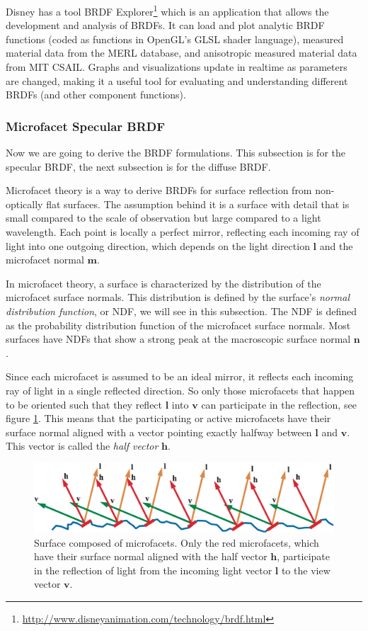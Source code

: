 Disney has a tool BRDF Explorer\footnote{\url{http://www.disneyanimation.com/technology/brdf.html}} which is an application that allows the development and analysis of BRDFs. It can load and plot analytic BRDF functions (coded as functions in OpenGL's GLSL shader language), measured material data from the MERL database, and anisotropic measured material data from MIT CSAIL. Graphs and visualizations update in realtime as parameters are changed, making it a useful tool for evaluating and understanding different BRDFs (and other component functions).


\subsubsection{Microfacet Specular BRDF}
Now we are going to derive the BRDF formulations. This subsection is for the specular BRDF, the next subsection is for the diffuse BRDF.

Microfacet theory is a way to derive BRDFs for surface reflection from non-optically flat surfaces. The assumption behind it is a surface with detail that is small compared to the scale of observation but large compared to a light wavelength. Each point is locally a perfect mirror, reflecting each incoming ray of light into one outgoing direction, which depends on the light direction $\mathbf{l}$ and the microfacet normal $\mathbf{m}$. 

In microfacet theory, a surface is characterized by the distribution of the microfacet surface normals. This distribution is defined by the surface's \textit{normal distribution function}, or NDF, we will see in this subsection. The NDF is defined as the probability distribution function of the microfacet surface normals. Most surfaces have NDFs that show a strong peak at the macroscopic surface normal $\mathbf{n}$.

Since each microfacet is assumed to be an ideal mirror, it reflects each incoming ray of light in a single reflected direction. So only those microfacets that happen to be oriented such that they reflect $\mathbf{l}$ into $\mathbf{v}$ can participate in the reflection, see figure \ref{f:microfacet}. This means that the participating or active microfacets have their surface normal aligned with a vector pointing exactly halfway between $\mathbf{l}$ and $\mathbf{v}$. This vector is called the \textit{half vector} $\mathbf{h}$.

\begin{figure}
\sidecaption
	\includegraphics[width=.65\textwidth]{graphics/gi/ray-optics-9}
	\caption{Surface composed of microfacets. Only the red microfacets, which have their surface normal aligned with the half vector $\mathbf{h}$, participate in the reflection of light from the incoming light vector $\mathbf{l}$ to the view vector $\mathbf{v}$.}
	\label{f:microfacet}
\end{figure}

